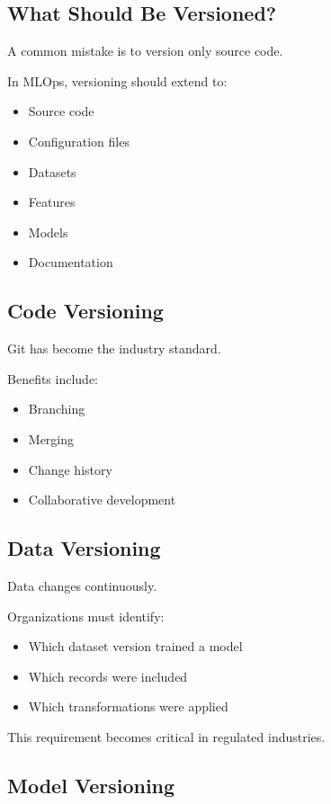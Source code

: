 \subsection{What Should Be Versioned?}

A common mistake is to version only source code.

In MLOps, versioning should extend to:

\begin{itemize}
    \item Source code
    \item Configuration files
    \item Datasets
    \item Features
    \item Models
    \item Documentation
\end{itemize}

\subsection{Code Versioning}

Git has become the industry standard.

Benefits include:

\begin{itemize}
    \item Branching
    \item Merging
    \item Change history
    \item Collaborative development
\end{itemize}

\subsection{Data Versioning}

Data changes continuously.

Organizations must identify:

\begin{itemize}
    \item Which dataset version trained a model
    \item Which records were included
    \item Which transformations were applied
\end{itemize}

This requirement becomes critical in regulated industries.

\subsection{Model Versioning}


